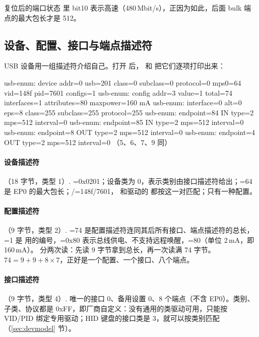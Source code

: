 复位后的端口状态  里 bit10 表示高速（480\,Mbit/s），正因为如此，后面 bulk 端点的最大包长才是 512。

\subsection{设备、配置、接口与端点描述符}
\label{sec:mt7601u-desc}

USB 设备用一组描述符介绍自己。打开  后， 和  把它们逐项打印出来：

\begin{txtcode}
usb-enum: device addr=0 usb=201 class=0 subclass=0 protocol=0 mps0=64 vid=148f pid=7601 configs=1
usb-enum: config addr=3 value=1 total=74 interfaces=1 attributes=80 maxpower=160 mA
usb-enum:  interface=0 alt=0 eps=8 class=255 subclass=255 protocol=255
usb-enum:   endpoint=84 IN type=2 mps=512 interval=0
usb-enum:   endpoint=85 IN type=2 mps=512 interval=0
usb-enum:   endpoint=8 OUT type=2 mps=512 interval=0
usb-enum:   endpoint=4 OUT type=2 mps=512 interval=0    （5、6、7、9 同）
\end{txtcode}

\paragraph{设备描述符}（18 字节，类型 1）. =0x0201；设备类为 0，表示类别由接口描述符给出；=64 是 EP0 的最大包长；/=148f/7601， 和驱动的  都按这一对匹配；只有一种配置。

\paragraph{配置描述符}（9 字节，类型 2）. =74 是配置描述符连同其后所有接口、端点描述符的总长，=1 是  用的编号，=0x80 表示总线供电、不支持远程唤醒，=80（单位 2\,mA，即 160\,mA）。 分两次读：先读 9 字节拿到总长，再一次读满 74 字节。$74 = 9 + 9 + 8\times 7$，正好是一个配置、一个接口、八个端点。

\paragraph{接口描述符}（9 字节，类型 4）. 唯一的接口 0、备用设置 0、8 个端点（不含 EP0）。类别、子类、协议都是 0xFF，即厂商自定义：没有通用的类驱动可用，只能按 VID/PID 绑定专用驱动；HID 键盘的接口类是 3，就可以按类别匹配（\ref{sec:devmodel} 节）。

